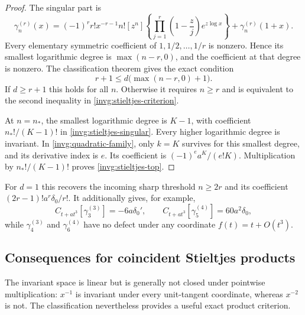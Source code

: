 \begin{proof}
The singular part is
\begin{equation}\label{invg:stieltjes-singular}
 \gamma_n^{(r)}(x)
 =(-1)^rr!x^{-r-1}
 n![z^n]\left\{\prod_{j=1}^{r}\left(1-\frac zj\right)e^{z\log x}\right\}
 +\gamma_n^{(r)}(1+x).
\end{equation}
Every elementary symmetric coefficient of
$1,1/2,\ldots,1/r$ is nonzero.  Hence its smallest logarithmic degree is
$\max(n-r,0)$, and the coefficient at that degree is nonzero.
The classification theorem gives the exact condition
\[
 r+1\le d\bigl(\max(n-r,0)+1\bigr).
\]
If $d\ge r+1$ this holds for all $n$.  Otherwise it requires $n\ge r$
and is equivalent to the second inequality in
\eqref{invg:stieltjes-criterion}.

At $n=n_*$, the smallest logarithmic degree is $K-1$, with coefficient
$n_*!/(K-1)!$ in \eqref{invg:stieltjes-singular}.  Every higher
logarithmic degree is invariant.  In
\eqref{invg:quadratic-family}, only $k=K$ survives for this smallest
degree, and its derivative index is $e$.  Its coefficient is
$(-1)^ea^K/(e!K)$.  Multiplication by $n_*!/(K-1)!$ proves
\eqref{invg:stieltjes-top}.
\end{proof}

For $d=1$ this recovers the incoming sharp threshold $n\ge2r$ and its
coefficient $(2r-1)!a^r\delta_0/r!$.  It additionally gives, for example,
\[
 C_{t+a t^3}[\gamma_3^{(3)}]=-6a\delta_0',
 \qquad
 C_{t+a t^3}[\gamma_5^{(4)}]=60a^2\delta_0,
\]
while $\gamma_4^{(3)}$ and $\gamma_6^{(4)}$ have no defect under any
coordinate $f(t)=t+O(t^3)$.

\subsection{Consequences for coincident Stieltjes products}

The invariant space is linear but is generally not closed under
pointwise multiplication: $x^{-1}$ is invariant under every unit-tangent
coordinate, whereas $x^{-2}$ is not.  The classification nevertheless
provides a useful exact product criterion.

